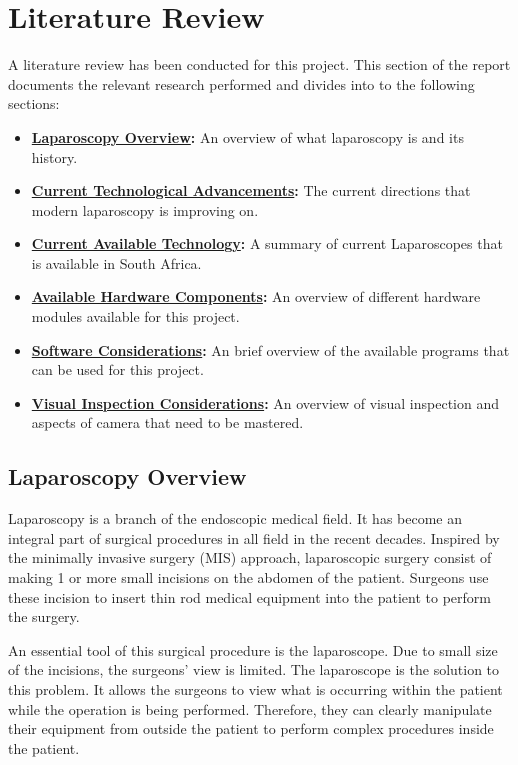 \chapter{Literature Review}
\label{sec:Literature Review}

A literature review has been conducted for this project. This section of the report documents the relevant research performed and divides into to the following sections:
\begin{itemize}
    \item \textbf{\hyperref[sec:Laparoscopy Overview]{Laparoscopy Overview}:} An overview of what laparoscopy is and its history.
    \item \textbf{\hyperref[sec:Current Technological Advancements]{Current Technological Advancements}:} The current directions that modern laparoscopy is improving on.
    \item \textbf{\hyperref[sec:Current Available Technology]{Current Available Technology}:} A summary of current Laparoscopes that is available in South Africa.
    \item \textbf{\hyperref[sec:Available Hardware Components]{Available Hardware Components}:} An overview of different hardware modules available for this project.
    \item \textbf{\hyperref[sec:Software Considerations]{Software Considerations}:} An brief overview of the available programs that can be used for this project.
    \item \textbf{\hyperref[sec:Visual Inspection Considerations]{Visual Inspection Considerations}:} An overview of visual inspection and aspects of camera that need to be mastered.
\end{itemize}

\section{Laparoscopy Overview}
\label{sec:Laparoscopy Overview}

Laparoscopy is a branch of the endoscopic medical field. It has become an integral part of surgical procedures in all field in the recent decades. Inspired by the minimally invasive surgery (MIS) approach, laparoscopic surgery consist of making 1 or more small incisions on the abdomen of the patient. Surgeons use these incision to insert thin rod medical equipment into the patient to perform the surgery. \citep{FIS-2021}

\vspace{0.5cm}
\noindent An essential tool of this surgical procedure is the laparoscope. Due to small size of the incisions, the surgeons' view is limited. The laparoscope is the solution to this problem. It allows the surgeons to view what is occurring within the patient while the operation is being performed. Therefore, they can clearly manipulate their equipment from outside the patient to perform complex procedures inside the patient. \citep{AIP-2018}

